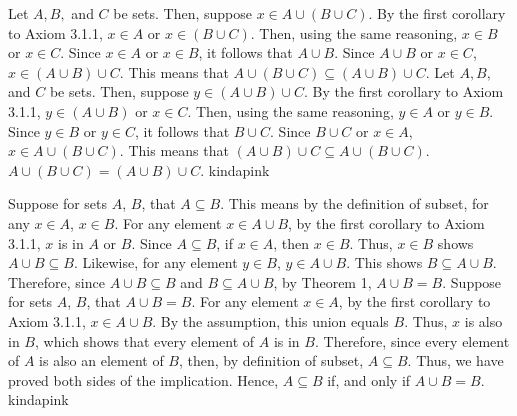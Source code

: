 
\sbseteqpf
    {Let $A,B,$ and $C$ be sets. Then, suppose $x\in A\cup (B\cup C)$. By the first corollary to Axiom 3.1.1, $x\in A$ or $x\in (B\cup C)$. Then, using the same reasoning, $x\in B$ or $x \in C$. Since $x\in A$ or $x\in B$, it follows that $A\cup B$. Since $A\cup B$ or $x\in C$, $x\in (A\cup B) \cup C$. This means that $A\cup (B\cup C) \subseteq (A\cup B) \cup C$.}
    {Let $A,B,$ and $C$ be sets. Then, suppose $y\in (A\cup B)\cup C$. By the first corollary to Axiom 3.1.1, $y\in (A\cup B)$ or $x\in C$. Then, using the same reasoning, $y\in A$ or $y\in B$. Since $y\in B$ or $y\in C$, it follows that $B\cup C$. Since $B\cup C$ or $x\in A$, $x\in A\cup (B \cup C)$. This means that $(A\cup B)\cup C \subseteq A\cup (B \cup C)$.}
    {$A\cup (B\cup C) = (A\cup B) \cup C$.}
    {kindapink}



\iffpf
    {Suppose for sets $A$, $B$, that $A\subseteq B$. This means by the definition of subset, for any $x\in A$, $x\in B$. For any element $x \in A\cup B$, by the first corollary to Axiom 3.1.1, $x$ is in $A$ or $B$. Since $A\subseteq B$, if $x\in A$, then $x\in B$. Thus, $x\in B$ shows $A\cup B \subseteq B$. Likewise, for any element $y \in B$, $y\in A\cup B$. This shows $B \subseteq A\cup B$. Therefore, since $A\cup B\subseteq B$ and $B\subseteq A\cup B$, by Theorem 1, $A \cup B = B$.}
    {Suppose for sets $A$, $B$, that $A \cup B = B$. For any element $x\in A$, by the first corollary to Axiom 3.1.1, $x\in A\cup B$. By the assumption, this union equals $B$. Thus, $x$ is also in $B$, which shows that every element of $A$ is in $B$. Therefore, since every element of $A$ is also an element of $B$, then, by definition of subset, $A\subseteq B$.}
    {Thus, we have proved both sides of the implication. Hence, $A \subseteq B$ if, and only if $A \cup B = B$.}
    {kindapink}
